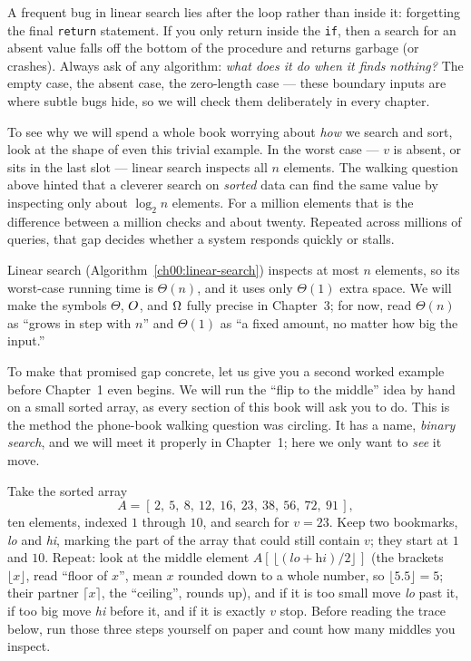 \begin{trapbox}
A frequent bug in linear search lies after the loop rather than inside it:
forgetting the final \texttt{return} statement. If you only return inside the \texttt{if}, then a
search for an absent value falls off the bottom of the procedure and returns
garbage (or crashes). Always ask of any algorithm: \emph{what does it do when it
finds nothing?} The empty case, the absent case, the zero-length case --- these boundary
inputs are where subtle bugs hide, so we will check them deliberately in every chapter.
\end{trapbox}

To see why we will spend a whole book worrying about \emph{how} we search and
sort, look at the shape of even this trivial example. In the worst case ---
$v$ is absent, or sits in the last slot --- linear search inspects all $n$
elements. The walking question above hinted that a cleverer search on
\emph{sorted} data can find the same value by inspecting only about $\log_2 n$
elements. For a million elements that is the difference between a million checks
and about twenty. Repeated across millions of queries, that gap decides whether a
system responds quickly or stalls.

\begin{complexitybox}
Linear search (Algorithm~\ref{ch00:linear-search}) inspects at most $n$ elements,
so its worst-case running time is $\Theta(n)$, and it uses only $\Theta(1)$ extra
space. We will make the symbols $\Theta$, $O$, and $\Omega$ fully precise in
Chapter~3; for now, read $\Theta(n)$ as ``grows in step with $n$'' and $\Theta(1)$
as ``a fixed amount, no matter how big the input.''
\end{complexitybox}

To make that promised gap concrete, let us give you a second worked example
before Chapter~1 even begins. We will run the ``flip to the middle'' idea by
hand on a small sorted array, as every section of this book will ask you
to do. This is the method the phone-book walking question was circling.
It has a name, \emph{binary search}, and we will meet it properly in Chapter~1;
here we only want to \emph{see} it move.

\begin{labbox}
Take the sorted array
\[
  A = [\,2,\ 5,\ 8,\ 12,\ 16,\ 23,\ 38,\ 56,\ 72,\ 91\,],
\]
ten elements, indexed $1$ through $10$, and search for $v = 23$. Keep two
bookmarks, \emph{lo} and \emph{hi}, marking the part of the array that could still
contain $v$; they start at $1$ and $10$. Repeat: look at the middle element
$A[\,\lfloor(\textit{lo}+\textit{hi})/2\rfloor\,]$ (the brackets $\lfloor x\rfloor$, read
``floor of $x$'', mean $x$ rounded down to a whole number, so $\lfloor 5.5\rfloor = 5$;
their partner $\lceil x\rceil$, the ``ceiling'', rounds up), and if it is too small move
\emph{lo} past it, if too big move \emph{hi} before it, and if it is
exactly $v$ stop. Before reading the trace below, run those three steps yourself
on paper and count how many middles you inspect.
\end{labbox}

